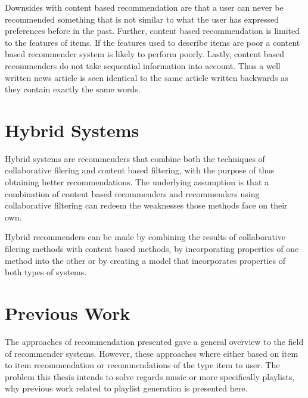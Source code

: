 \documentclass[a4paper,11pt]{kth-mag}
\begin{document}
Downsides with content based recommendation are that a user can never be recommended something that is not similar to what the user has expressed preferences before in the past. Further, content based recommendation is limited to the features of items. If the features used to describe items are poor a content based recommender system is likely to perform poorly. Lastly, content based recommenders do not take sequential information into account. Thus a well written news article is seen identical to the same article written backwards as they contain exactly the same words\cite{adomavicius2005toward}.

\section{Hybrid Systems}
Hybrid systems are recommenders that combine both the techniques of collaborative filering and content based filtering, with the purpose of thus obtaining better recommendations. The underlying assumption is that a combination of content based recommenders and recommenders using collaborative filtering can redeem the weaknesses those methods face on their own\cite{gunawardana2009unified}. 

Hybrid recommenders can be made by combining the results of collaborative filering methods with content based methods, by incorporating properties of one method into the other or by creating a model that incorporates properties of both types of systems\cite{adomavicius2005toward}.

\section{Previous Work}
The approaches of recommendation presented gave a general overview to the field of recommender systems. However, these approaches where either based on item to item recommendation or recommendations of the type item to user. The problem this thesis intends to solve regards music or more specifically playlists, why previous work related to playlist generation is presented here. 
\end{document}
